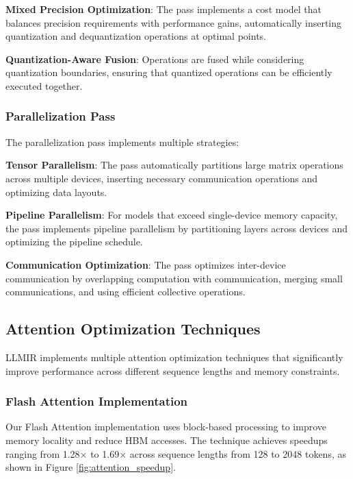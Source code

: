 \documentclass[conference]{IEEEtran}
\begin{document}
\textbf{Mixed Precision Optimization}: The pass implements a cost model that balances precision requirements with performance gains, automatically inserting quantization and dequantization operations at optimal points.

\textbf{Quantization-Aware Fusion}: Operations are fused while considering quantization boundaries, ensuring that quantized operations can be efficiently executed together.

\subsubsection{Parallelization Pass}

The parallelization pass implements multiple strategies:

\textbf{Tensor Parallelism}: The pass automatically partitions large matrix operations across multiple devices, inserting necessary communication operations and optimizing data layouts.

\textbf{Pipeline Parallelism}: For models that exceed single-device memory capacity, the pass implements pipeline parallelism by partitioning layers across devices and optimizing the pipeline schedule.

\textbf{Communication Optimization}: The pass optimizes inter-device communication by overlapping computation with communication, merging small communications, and using efficient collective operations.

\subsection{Attention Optimization Techniques}

LLMIR implements multiple attention optimization techniques that significantly improve performance across different sequence lengths and memory constraints.

\subsubsection{Flash Attention Implementation}

Our Flash Attention implementation uses block-based processing to improve memory locality and reduce HBM accesses. The technique achieves speedups ranging from 1.28× to 1.69× across sequence lengths from 128 to 2048 tokens, as shown in Figure \ref{fig:attention_speedup}.
\end{document}
